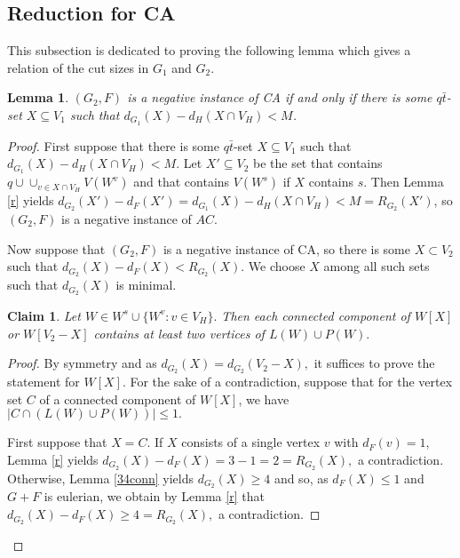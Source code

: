\documentclass[a4paper,12pt,makeidx]{article}
\newtheorem{claim}{Claim}
\newtheorem{lemma}{Lemma}
\begin{document}
\subsection{Reduction for CA}
This subsection is dedicated to proving the following lemma which gives a relation of the cut sizes in $G_1$ and $G_2$.
\begin{lemma}\label{ausbeul}
$(G_2,F)$ is a negative instance of CA if and only if there is some $q\bar{t}$-set $X\subseteq V_1$ such that $d_{G_1}(X)-d_H(X\cap V_H)<M$.
\end{lemma}
\begin{proof}
First suppose that there is some $q\bar{t}$-set $X\subseteq V_1$ such that $d_{G_1}(X)-d_H(X\cap V_H)<M$. Let $X'\subseteq V_2$ be the set that contains $q \cup \cup_{v \in X\cap V_H}V(W^v)$ and that contains $V(W^s)$ if $X$ contains $s$. Then Lemma \ref{r} yields $d_{G_2}(X')-d_F(X')=d_{G_1}(X)-d_H(X \cap V_H)<M = R_{G_2}(X')$, so $(G_2,F)$ is a negative instance of $AC$.
\medskip

Now suppose that $(G_2,F)$ is a negative instance of CA, so there is some $X\subset V_2$  such that $d_{G_2}(X)-d_F(X) < R_{G_2}(X).$  We choose $X$ among all such sets such that $d_{G_2}(X)$ is minimal.

\begin{claim}\label{yfgyi}
 Let $W\in W^s\cup\{W^v:v \in V_H\}.$ Then each connected component of $W[X]$ or $W[V_2-X]$  contains at least two vertices of $L(W)\cup P(W).$
\end{claim}
\begin{proof}
By symmetry and as $d_{G_2}(X) = d_{G_2}(V_2-X),$ it suffices to prove the statement for $W[X].$ For the sake of a contradiction, suppose that for the vertex set $C$ of a connected component of $W[X]$, we have $|C\cap(L(W)\cup P(W))|\le 1.$ 

First suppose that $X=C$. If $X$ consists of a single vertex $v$ with $d_F(v)=1$, Lemma \ref{r} yields $d_{G_2}(X)-d_F(X) =3-1=2= R_{G_2}(X),$ a contradiction. Otherwise, Lemma \ref{34conn} yields $d_{G_2}(X)\geq 4$ and so, as $d_F(X)\leq 1$ and $G+F$ is eulerian, we obtain by Lemma \ref{r} that $d_{G_2}(X)-d_F(X) \geq 4= R_{G_2}(X),$ a contradiction.


\end{proof}
\end{proof}
\end{document}
